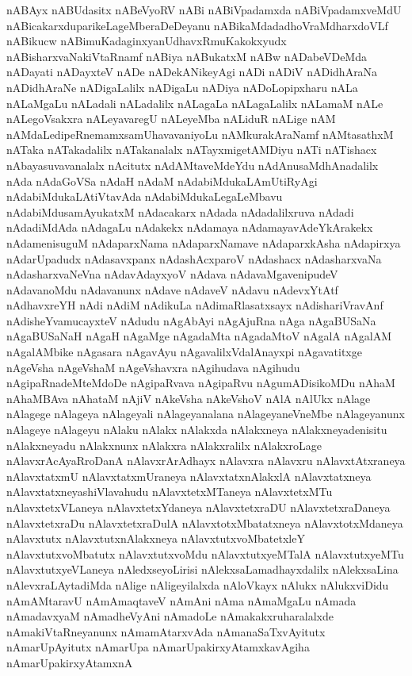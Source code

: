 {nABAyx
nABUdasitx
nABeVyoRV
nABi
nABiVpadamxda
nABiVpadamxveMdU
nABicakarxduparikeLageMberaDeDeyanu
nABikaMdadadhoVraMdharxdoVLf
nABikucw
nABimuKadaginxyanUdhavxRmuKakokxyudx
nABisharxvaNakiVtaRnamf
nABiya
nABukatxM
nABw
nADabeVDeMda
nADayati
nADayxteV
nADe
nADekANikeyAgi
nADi
nADiV
nADidhAraNa
nADidhAraNe
nADigaLalilx
nADigaLu
nADiya
nADoLopipxharu
nALa
nALaMgaLu
nALadali
nALadalilx
nALagaLa
nALagaLalilx
nALamaM
nALe
nALegoVsakxra
nALeyavaregU
nALeyeMba
nALiduR
nALige
nAM
nAMdaLedipeRnemamxsamUhavavaniyoLu
nAMkurakAraNamf
nAMtasathxM
nATaka
nATakadalilx
nATakanalalx
nATayxmigetAMDiyu
nATi
nATishacx
nAbayasuvavanalalx
nAcitutx
nAdAMtaveMdeYdu
nAdAnusaMdhAnadalilx
nAda
nAdaGoVSa
nAdaH
nAdaM
nAdabiMdukaLAmUtiRyAgi
nAdabiMdukaLAtiVtavAda
nAdabiMdukaLegaLeMbavu
nAdabiMdusamAyukatxM
nAdacakarx
nAdada
nAdadalilxruva
nAdadi
nAdadiMdAda
nAdagaLu
nAdakekx
nAdamaya
nAdamayavAdeYkArakekx
nAdamenisuguM
nAdaparxNama
nAdaparxNamave
nAdaparxkAsha
nAdapirxya
nAdarUpadudx
nAdasavxpanx
nAdashAcxparoV
nAdashacx
nAdasharxvaNa
nAdasharxvaNeVna
nAdavAdayxyoV
nAdava
nAdavaMgavenipudeV
nAdavanoMdu
nAdavanunx
nAdave
nAdaveV
nAdavu
nAdevxYtAtf
nAdhavxreYH
nAdi
nAdiM
nAdikuLa
nAdimaRlasatxsayx
nAdishariVravAnf
nAdisheYvamucayxteV
nAdudu
nAgAbAyi
nAgAjuRna
nAga
nAgaBUSaNa
nAgaBUSaNaH
nAgaH
nAgaMge
nAgadaMta
nAgadaMtoV
nAgalA
nAgalAM
nAgalAMbike
nAgasara
nAgavAyu
nAgavalilxVdalAnayxpi
nAgavatitxge
nAgeVsha
nAgeVshaM
nAgeVshavxra
nAgihudava
nAgihudu
nAgipaRnadeMteMdoDe
nAgipaRvava
nAgipaRvu
nAgumADisikoMDu
nAhaM
nAhaMBAva
nAhataM
nAjiV
nAkeVsha
nAkeVshoV
nAlA
nAlUkx
nAlage
nAlagege
nAlageya
nAlageyali
nAlageyanalana
nAlageyaneVneMbe
nAlageyanunx
nAlageye
nAlageyu
nAlaku
nAlakx
nAlakxda
nAlakxneya
nAlakxneyadenisitu
nAlakxneyadu
nAlakxnunx
nAlakxra
nAlakxralilx
nAlakxroLage
nAlavxrAcAyaRroDanA
nAlavxrArAdhayx
nAlavxra
nAlavxru
nAlavxtAtxraneya
nAlavxtatxmU
nAlavxtatxmUraneya
nAlavxtatxnAlakxlA
nAlavxtatxneya
nAlavxtatxneyashiVlavahudu
nAlavxtetxMTaneya
nAlavxtetxMTu
nAlavxtetxVLaneya
nAlavxtetxYdaneya
nAlavxtetxraDU
nAlavxtetxraDaneya
nAlavxtetxraDu
nAlavxtetxraDulA
nAlavxtotxMbatatxneya
nAlavxtotxMdaneya
nAlavxtutx
nAlavxtutxnAlakxneya
nAlavxtutxvoMbatetxleY
nAlavxtutxvoMbatutx
nAlavxtutxvoMdu
nAlavxtutxyeMTalA
nAlavxtutxyeMTu
nAlavxtutxyeVLaneya
nAledxseyoLirisi
nAlekxsaLamadhayxdalilx
nAlekxsaLina
nAlevxraLAytadiMda
nAlige
nAligeyilalxda
nAloVkayx
nAlukx
nAlukxviDidu
nAmAMtaravU
nAmAmaqtaveV
nAmAni
nAma
nAmaMgaLu
nAmada
nAmadavxyaM
nAmadheVyAni
nAmadoLe
nAmakakxruharalalxde
nAmakiVtaRneyanunx
nAmamAtarxvAda
nAmanaSaTxvAyitutx
nAmarUpAyitutx
nAmarUpa
nAmarUpakirxyAtamxkavAgiha
nAmarUpakirxyAtamxnA
}
